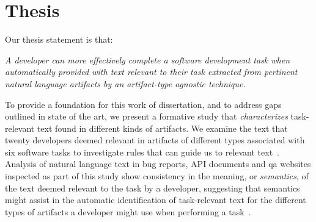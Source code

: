 

\section{Thesis}
\label{cp1:thesis}




Our thesis statement is that:




\bigskip
\begin{bluequote}
    \textit{A developer can more effectively complete a software development task when automatically provided with text relevant to their task extracted from pertinent natural language artifacts
    by an artifact-type agnostic technique.}
\end{bluequote}
\medskip



To provide a foundation for this work of dissertation,
and to  address gaps outlined in state of the art, 
we present a formative study that \textit{characterizes} task-relevant text 
found in different kinds of artifacts. 
We examine the text that twenty developers deemed relevant in artifacts 
of different types associated with six software tasks to investigate 
rules that can guide us to relevant text~\cite{Kintsch1978a}.
Analysis of natural language text  in bug
reports, API documents and \ac{qa} websites 
inspected as part of this study 
 show consistency in the meaning, or \textit{semantics}, of the
 text deemed relevant to the task by a developer, suggesting that 
semantics might assist in the automatic identification of
task-relevant text for the different types of artifacts a developer 
might use when performing a task~\cite{Meyer2019, Li2013}.



